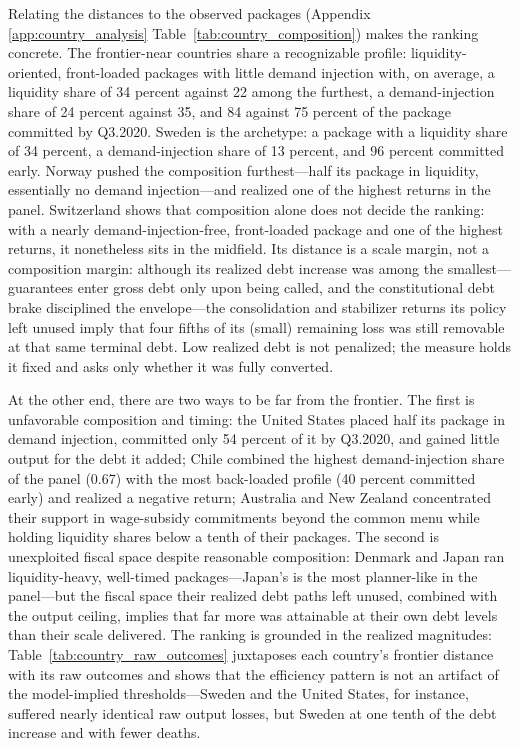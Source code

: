 \documentclass[12pt, a4paper]{article}
\begin{document}
\noindent Relating the distances to the observed packages (Appendix \ref{app:country_analysis}  Table~\ref{tab:country_composition}) makes the ranking concrete. The frontier-near countries share a recognizable profile: liquidity-oriented, front-loaded packages with little demand injection with, on average, a liquidity share of 34 percent against 22 among the furthest, a demand-injection share of 24 percent against 35, and 84 against 75 percent of the package committed by Q3.2020. Sweden is the archetype: a package with a liquidity share of 34 percent, a demand-injection share of 13 percent, and 96 percent committed early. Norway pushed the composition furthest---half its package in liquidity, essentially no demand injection---and realized one of the highest returns in the panel. Switzerland shows that composition alone does not decide the ranking: with a nearly demand-injection-free, front-loaded package and one of the highest returns, it nonetheless sits in the midfield. Its distance is a scale margin, not a composition margin: although its realized debt increase was among the smallest---guarantees enter gross debt only upon being called, and the constitutional debt brake disciplined the envelope---the consolidation and stabilizer returns its policy left unused imply that four fifths of its (small) remaining loss was still removable at
that same terminal debt. Low realized debt is not penalized; the measure holds it fixed and asks only whether it was fully converted.


At the other end, there are two ways to be far from the frontier. The first is unfavorable composition and timing: the United States placed half its package in demand injection, committed
only 54 percent of it by Q3.2020, and gained little output for the debt it added; Chile combined the highest demand-injection share of the panel (0.67) with the most back-loaded profile (40 percent committed early) and realized a negative return; Australia and New Zealand concentrated their support in wage-subsidy commitments beyond the common menu while holding liquidity shares below a tenth of their packages. The second is unexploited fiscal space despite reasonable composition: Denmark and Japan ran liquidity-heavy, well-timed packages---Japan's is the most planner-like in the panel---but the fiscal space their realized debt paths left unused, combined with the output ceiling, implies that far more was attainable at their own debt levels than their scale delivered. The ranking is grounded in the realized magnitudes: Table~\ref{tab:country_raw_outcomes} juxtaposes each country's frontier distance with its raw outcomes and shows that the efficiency pattern is not an artifact of the model-implied thresholds---Sweden and the United States, for instance, suffered nearly identical raw output losses, but Sweden at one tenth of the debt increase and with fewer deaths.
\end{document}
